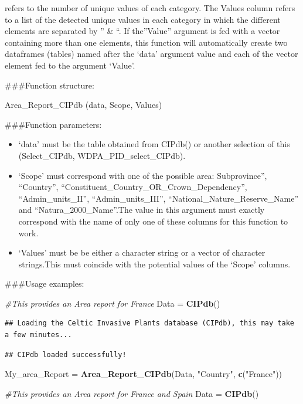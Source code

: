\documentclass[
]{article}
\newenvironment{Shaded}{\begin{snugshade}}{\end{snugshade}}
\newcommand{\CommentTok}[1]{\textcolor[rgb]{0.56,0.35,0.01}{\textit{#1}}}
\newcommand{\FunctionTok}[1]{\textcolor[rgb]{0.13,0.29,0.53}{\textbf{#1}}}
\newcommand{\NormalTok}[1]{#1}
\newcommand{\OtherTok}[1]{\textcolor[rgb]{0.56,0.35,0.01}{#1}}
\newcommand{\StringTok}[1]{\textcolor[rgb]{0.31,0.60,0.02}{#1}}
\providecommand{\tightlist}{%
  \setlength{\itemsep}{0pt}\setlength{\parskip}{0pt}}
\begin{document}
refers to the number of unique values of each category. The Values
column refers to a list of the detected unique values in each category
in which the different elements are separated by '' \& ``. If
the''Value'' argument is fed with a vector containing more than one
elements, this function will automatically create two dataframes
(tables) named after the `data' argument value and each of the vector
element fed to the argument `Value'.

\#\#\#Function structure:

Area\_Report\_CIPdb (data, Scope, Values)

\#\#\#Function parameters:

\begin{itemize}
\tightlist
\item
  `data' must be the table obtained from CIPdb() or another selection of
  this (Select\_CIPdb, WDPA\_PID\_select\_CIPdb).
\item
  `Scope' must correspond with one of the possible area: Subprovince'',
  ``Country'', ``Constituent\_Country\_OR\_Crown\_Dependency'',
  ``Admin\_units\_II'', ``Admin\_units\_III'',
  ``National\_Nature\_Reserve\_Name'' and ``Natura\_2000\_Name''.The
  value in this argument must exactly correspond with the name of only
  one of these columns for this function to work.
\item
  `Values' must be be either a character string or a vector of character
  strings.This must coincide with the potential values of the `Scope'
  columns.
\end{itemize}

\#\#\#Usage examples:

\begin{Shaded}
\begin{Highlighting}[]
\CommentTok{\#This provides an Area report for France}
\NormalTok{Data }\OtherTok{=} \FunctionTok{CIPdb}\NormalTok{()}
\end{Highlighting}
\end{Shaded}

\begin{verbatim}
## Loading the Celtic Invasive Plants database (CIPdb), this may take a few minutes...
\end{verbatim}

\begin{verbatim}
## CIPdb loaded successfully!
\end{verbatim}

\begin{Shaded}
\begin{Highlighting}[]
\NormalTok{My\_area\_Report }\OtherTok{=} \FunctionTok{Area\_Report\_CIPdb}\NormalTok{(Data, }\StringTok{"Country"}\NormalTok{, }\FunctionTok{c}\NormalTok{(}\StringTok{"France"}\NormalTok{))}

\CommentTok{\#This provides an Area report for France  and Spain}
\NormalTok{Data }\OtherTok{=} \FunctionTok{CIPdb}\NormalTok{()}
\end{Highlighting}
\end{Shaded}
\end{document}
